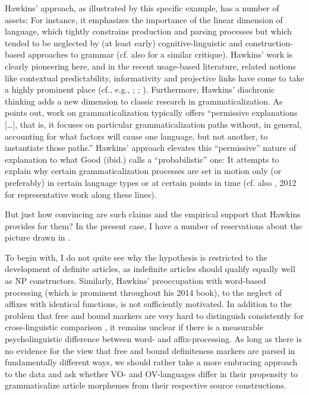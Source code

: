 \documentclass[output=paper]{langsci/langscibook}
\begin{document}
Hawkins’ approach, as illustrated by this specific example, has a number of assets: For instance, it emphasizes the importance of the linear dimension of language, which tightly constrains production and parsing processes but which tended to be neglected by (at least early) cognitive-linguistic and construction-based approaches to grammar (cf. also \citealt{Diessel2011} for a similar critique). Hawkins’ work is clearly pioneering here, and in the recent usage-based literature, related notions like contextual predictability, informativity and projective links have come to take a highly prominent place (cf., e.g., \citealt{GahlGarnsey2004}; \citealt{Levy2008}; \citealt{Auer2009}). Furthermore, Hawkins’ diachronic thinking adds a new dimension to classic research in grammaticalization. As \citet[7]{Good2008} points out, work on grammaticalization typically offers “permissive explanations […], that is, it focuses on particular grammaticalization paths without, in general, accounting for what factors will cause one language, but not another, to instantiate those paths.” Hawkins’ approach elevates this “permissive” nature of explanation to what Good (ibid.) calls a “probabilistic” one: It attempts to explain why certain grammaticalization processes are set in motion only (or preferably) in certain language types or at certain points in time (cf. also \citealt{Hawkins1986}, 2012 for representative work along these lines).

But just how convincing are such claims and the empirical support that Hawkins provides for them? In the present case, I have a number of reservations about the picture drawn in \citet{Hawkins2014}.

To begin with, I do not quite see why the hypothesis is restricted to the development of definite articles, as indefinite articles should qualify equally well as NP constructors. Similarly, Hawkins’ preoccupation with word-based processing (which is prominent throughout his 2014 book), to the neglect of affixes with identical functions, is not sufficiently motivated. In addition to the problem that free and bound markers are very hard to distinguish consistently for cross-linguistic comparison \citep{Haspelmath2011}, it remains unclear if there is a measurable psycholinguistic difference between word- and affix-processing. As long as there is no evidence for the view that free and bound definiteness markers are parsed in fundamentally different ways, we should rather take a more embracing approach to the data and ask whether VO- and OV-languages differ in their propensity to grammaticalize article morphemes from their respective source constructions.
\end{document}
